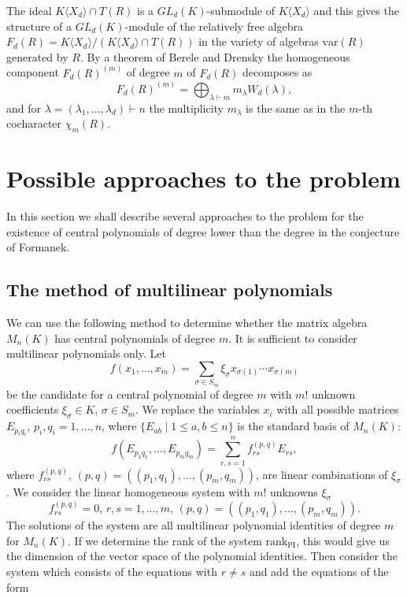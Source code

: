 \documentclass[12pt]{amsart}
\theoremstyle{definition}
\begin{document}
The ideal $K\langle X_d\rangle\cap T(R)$ is a $GL_d(K)$-submodule of $K\langle X_d\rangle$ and this gives the structure of a $GL_d(K)$-module
of the relatively free algebra $F_d(R)=K\langle X_d\rangle/(K\langle X_d\rangle\cap T(R))$ in the variety of algebras $\text{var}(R)$ generated by $R$.
By a theorem of Berele \cite{Ber} and Drensky \cite{Dr1} the homogeneous component $F_d(R)^{(m)}$ of degree $m$ of $F_d(R)$ decomposes as
\[
F_d(R)^{(m)}=\bigoplus_{\lambda\vdash m}m_{\lambda}W_d(\lambda),
\]
and for $\lambda=(\lambda_1,\ldots,\lambda_d)\vdash n$ the multiplicity $m_{\lambda}$ is the same as in the $m$-th cocharacter $\chi_m(R)$.

\section{Possible approaches to the problem}
In this section we shall describe several approaches to the problem for the existence of central polynomials of degree lower than the degree in the conjecture of Formanek.

\subsection{The method of multilinear polynomials}
We can use the following method to determine whether the matrix algebra $M_n(K)$ has central polynomials of degree $m$.
It is sufficient to consider multilinear polynomials only. Let
\[
f(x_1,\ldots,x_m)=\sum_{\sigma\in S_m}\xi_{\sigma}x_{\sigma(1)}\cdots x_{\sigma(m)}
\]
be the candidate for a central polynomial of degree $m$ with $m!$ unknown coefficients $\xi_{\sigma}\in K$, $\sigma\in S_m$.
We replace the variables $x_i$ with all possible matrices $E_{p_iq_i}$, $p_i,q_i=1,\ldots,n$, where $\{E_{ab}\mid 1\leq a,b\leq n\}$ is the standard basis of $M_n(K)$:
\[
f(E_{p_1q_1},\ldots,E_{p_mq_m})=\sum_{r,s=1}^nf^{(p,q)}_{rs}E_{rs},
\]
where $f^{(p,q)}_{rs}$, $(p,q)=((p_1,q_1),\ldots,(p_m,q_m))$, are linear combinations of $\xi_{\sigma}$.
We consider the linear homogeneous system with $m!$ unknowns $\xi_{\sigma}$
\[
f^{(p,q)}_{rs}=0,\,r,s=1,\ldots,m,\,(p,q)=((p_1,q_1),\ldots,(p_m,q_m)).
\]
The solutions of the system are all multilinear polynomial identities of degree $m$ for $M_n(K)$. If we determine the rank of the system $\text{rank}_{\text{PI}}$, this would give us
the dimension of the vector space of the polynomial identities. Then consider the system which consists of the equations with $r\not=s$ and add the equations of the form
\end{document}
